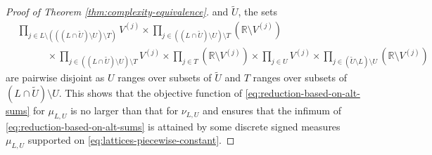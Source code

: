 \documentclass[10pt]{article}
\newcommand{\R}{{\mathbb R}}
\begin{document}
\begin{proof}[Proof of Theorem \ref{thm:complexity-equivalence}]
and $\widetilde{U}$, the sets
\begin{equation*}
\begin{aligned}
    &\prod_{j \in L 
    \setminus (((L \cap \widetilde{U}) \setminus U) \setminus T)} V^{(j)}  
    \times \prod_{j \in ((L \cap \widetilde{U}) \setminus U) \setminus T} 
    (\R \setminus V^{(j)}) \\
    &\qquad \quad  
    \times \prod_{j \in ((L \cap \widetilde{U})\setminus U) \setminus T} V^{(j)} 
    \times \prod_{j \in T} (\R \setminus V^{(j)})
    \times \prod_{j \in U} V^{(j)} 
    \times \prod_{j \in (\widetilde{U} \setminus L) \setminus U} 
    (\R \setminus V^{(j)}) 
\end{aligned}
\end{equation*}
are pairwise disjoint as $U$ ranges over subsets of $\widetilde{U}$ and 
$T$ ranges over subsets of $(L \cap \widetilde{U}) \setminus U$.
This shows that the objective function of 
\eqref{eq:reduction-based-on-alt-sums} for 
$\mu_{L, U}$ is no larger than that for $\nu_{L, U}$ and 
ensures that the infimum of \eqref{eq:reduction-based-on-alt-sums} is 
attained by some discrete signed measures 
$\mu_{L, U}$ supported on \eqref{eq:lattices-piecewise-constant}.
    

\end{proof}
\end{document}
